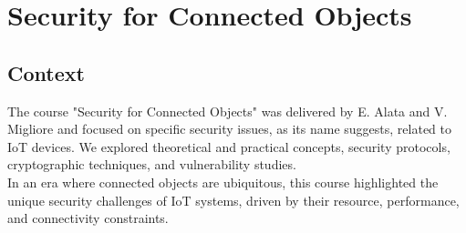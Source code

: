 




\section{Security for Connected Objects}
\subsection{Context}
\indent \indent The course "Security for Connected Objects" was delivered by E. Alata and V. Migliore and focused on specific security issues, as its name suggests, related to IoT devices. We explored theoretical and practical concepts, security protocols, cryptographic techniques, and vulnerability studies.\\
\noindent In an era where connected objects are ubiquitous, this course highlighted the unique security challenges of IoT systems, driven by their resource, performance, and connectivity constraints.

